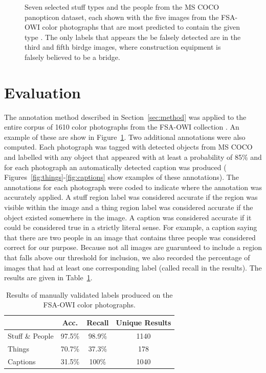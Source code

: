 \documentclass[10pt, a4paper]{article}
\begin{document}
\begin{figure}[!ht]
\begin{center}
\caption{Seven selected stuff types and the people from the MS COCO panopticon
dataset, each shown with the five images from the FSA-OWI color photographs
that are most predicted to contain the given type \protect\cite{wu2019detectron2}.
The only labels that appears the be falsely detected are in the third and
fifth birdge images, where construction equipment is falsely believed to be a
bridge.}
\label{fig:stuff}
\end{center}
\end{figure}

\section{Evaluation} \label{sec:eval}

The annotation method described in Section~\ref{sec:method} was applied to the
entire corpus of 1610 color photographs from the FSA-OWI collection
\cite{trachtenberg1990reading}. An example of these are show in
Figure~\ref{fig:stuff}. Two additional annotations were also computed.
Each photograph was tagged with detected objects from MS COCO and labelled with
any object that appeared with at least a probability of 85\% and for each
photograph an automatically detected caption was produced (
Figures~\ref{fig:things}-\ref{fig:captions} show examples of these annotations).
The annotations for each photograph were coded to indicate where the annotation
was accurately applied. A stuff region label was considered accurate if the
region was visible within the image and a thing region label was considered
accurate if the object existed somewhere in the image. A caption was considered
accurate if it could be considered true in a strictly literal sense. For
example, a caption saying that there are two people in an image that contains
three people was considered correct for our purpose. Because not all images
are guarunteed to include a region that falls above our threshold for inclusion,
we also recorded the percentage of images that had at least one
corresponding label (called recall in the results). The results are given in
Table~\ref{tab:results}.

\begin{table}[ht!]
\centering
\begin{tabular}{lccc}
 \hline
 & \textbf{Acc.} & \textbf{Recall} & \textbf{Unique Results} \\
 \hline
Stuff \& People & 97.5\% & 98.9\% & 1140 \\
Things & 70.7\% & 37.3\% & 178 \\
Captions & 31.5\% & 100\% & 1040 \\
  \hline
\end{tabular}
\caption{Results of manually validated labels produced on the FSA-OWI color
photographs.}
\label{tab:results}
\end{table}
\end{document}
